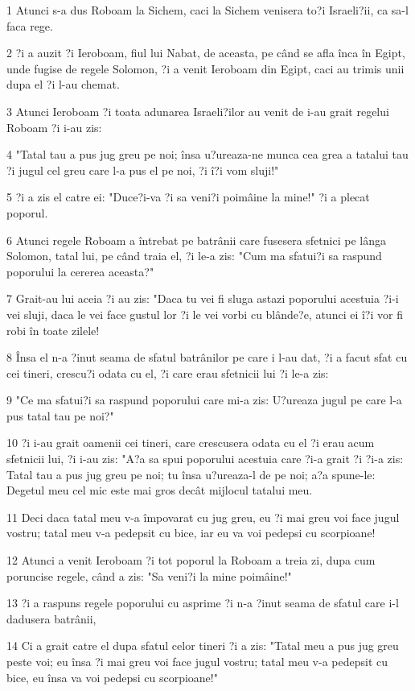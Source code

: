 \par 1 Atunci s-a dus Roboam la Sichem, caci la Sichem venisera to?i Israeli?ii, ca sa-l faca rege.
\par 2 ?i a auzit ?i Ieroboam, fiul lui Nabat, de aceasta, pe când se afla înca în Egipt, unde fugise de regele Solomon, ?i a venit Ieroboam din Egipt, caci au trimis unii dupa el ?i l-au chemat.
\par 3 Atunci Ieroboam ?i toata adunarea Israeli?ilor au venit de i-au grait regelui Roboam ?i i-au zis:
\par 4 "Tatal tau a pus jug greu pe noi; însa u?ureaza-ne munca cea grea a tatalui tau ?i jugul cel greu care l-a pus el pe noi, ?i î?i vom sluji!"
\par 5 ?i a zis el catre ei: "Duce?i-va ?i sa veni?i poimâine la mine!" ?i a plecat poporul.
\par 6 Atunci regele Roboam a întrebat pe batrânii care fusesera sfetnici pe lânga Solomon, tatal lui, pe când traia el, ?i le-a zis: "Cum ma sfatui?i sa raspund poporului la cererea aceasta?"
\par 7 Grait-au lui aceia ?i au zis: "Daca tu vei fi sluga astazi poporului acestuia ?i-i vei sluji, daca le vei face gustul lor ?i le vei vorbi cu blânde?e, atunci ei î?i vor fi robi în toate zilele!
\par 8 Însa el n-a ?inut seama de sfatul batrânilor pe care i l-au dat, ?i a facut sfat cu cei tineri, crescu?i odata cu el, ?i care erau sfetnicii lui ?i le-a zis:
\par 9 "Ce ma sfatui?i sa raspund poporului care mi-a zis: U?ureaza jugul pe care l-a pus tatal tau pe noi?"
\par 10 ?i i-au grait oamenii cei tineri, care crescusera odata cu el ?i erau acum sfetnicii lui, ?i i-au zis: "A?a sa spui poporului acestuia care ?i-a grait ?i ?i-a zis: Tatal tau a pus jug greu pe noi; tu însa u?ureaza-l de pe noi; a?a spune-le: Degetul meu cel mic este mai gros decât mijlocul tatalui meu.
\par 11 Deci daca tatal meu v-a împovarat cu jug greu, eu ?i mai greu voi face jugul vostru; tatal meu v-a pedepsit cu bice, iar eu va voi pedepsi cu scorpioane!
\par 12 Atunci a venit Ieroboam ?i tot poporul la Roboam a treia zi, dupa cum poruncise regele, când a zis: "Sa veni?i la mine poimâine!"
\par 13 ?i a raspuns regele poporului cu asprime ?i n-a ?inut seama de sfatul care i-l dadusera batrânii,
\par 14 Ci a grait catre el dupa sfatul celor tineri ?i a zis: "Tatal meu a pus jug greu peste voi; eu însa ?i mai greu voi face jugul vostru; tatal meu v-a pedepsit cu bice, eu însa va voi pedepsi cu scorpioane!"
